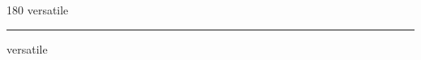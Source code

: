 
\begin{frame}
\begin{center}
\begin{turn}{180}
{\fontsize{2.5cm}{1em}\selectfont versatile}
\end{turn}
\vspace{1em}\par  
\hrule
\vspace{1em}\par  
{\fontsize{2.5cm}{1em}\selectfont versatile}
\end{center}
\end{frame}
